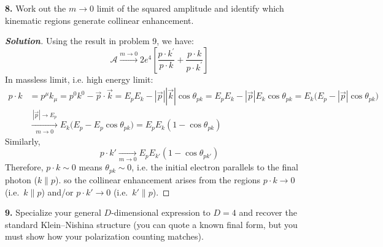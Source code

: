\documentclass[11pt]{article}
\newenvironment{solution}[1][]{\begin{proof}[\textbf{Solution}]}{\end{proof}}
\begin{document}
\begin{tcolorbox}[problem]
\textbf{8.} Work out the $m\to 0$ limit of the squared amplitude and identify which kinematic regions generate collinear enhancement.
\end{tcolorbox}
\begin{solution}[14.8]
	Using the result in problem 9, we have:
	\[
	\mathcal{A}\xrightarrow{m\to 0}2e^4\left[\frac{p\cdot k^{\prime}}{p\cdot k}+\frac{p\cdot k}{p\cdot k^{\prime}}\right]
	\]
	In massless limit, i.e. high energy limit:
	\[
	\begin{aligned}
			p\cdot k
		&= p^\mu k_\mu
		= p^0k^0-\vec p\cdot\vec k
		= E_pE_k-|\vec p||\vec k|\cos\theta_{pk}
		= E_pE_k-|\vec p|E_k\cos\theta_{pk}
		= E_k\bigl(E_p-|\vec p|\cos\theta_{pk}\bigr)\\
		&\xrightarrow[m\to0]{\,|\vec p|\to E_p\,}
		E_k\bigl(E_p-E_p\cos\theta_{pk}\bigr)
		= E_pE_k(1-\cos\theta_{pk})
	\end{aligned}
	\]
	Similarly,
	\[
	p\cdot k' \xrightarrow[m\to0]{} E_pE_{k'}(1-\cos\theta_{pk'})
	\]
	Therefore, $p\cdot k\sim 0$ means $\theta_{pk}\sim 0$, i.e. the initial electron parallels to the final photon ($k\parallel p$). so the collinear enhancement arises from the regions \(p\cdot k\to0\) (i.e.\ \(k\parallel p\)) and/or \(p\cdot k'\to0\) (i.e.\ \(k'\parallel p\)).
	
\end{solution}
\begin{tcolorbox}[problem]
\textbf{9.} Specialize your general $D$-dimensional expression to $D=4$ and recover the standard Klein--Nishina structure (you can quote a known final form, but you must show how your polarization counting matches).
\end{tcolorbox}
\end{document}
